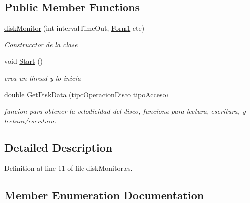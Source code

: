 \subsection*{Public Member Functions}
\begin{DoxyCompactItemize}
\item 
\hyperlink{class_windows_forms_application1_1_1_models_1_1disk_monitor_a1adc13f29078356113f2688eef9c1d70}{disk\+Monitor} (int interval\+Time\+Out, \hyperlink{class_windows_forms_application1_1_1_form1}{Form1} cte)
\begin{DoxyCompactList}\small\item\em Construcctor de la clase \end{DoxyCompactList}\item 
void \hyperlink{class_windows_forms_application1_1_1_models_1_1disk_monitor_aea00f90a1d1f844635454060c76133a0}{Start} ()
\begin{DoxyCompactList}\small\item\em crea un thread y lo inicia \end{DoxyCompactList}\item 
double \hyperlink{class_windows_forms_application1_1_1_models_1_1disk_monitor_a3d5bf64d33553c41813a96769b898503}{Get\+Disk\+Data} (\hyperlink{class_windows_forms_application1_1_1_models_1_1disk_monitor_a5e72e797fa7e0095f80d5069b11ae0ec}{tipo\+Operacion\+Disco} tipo\+Acceso)
\begin{DoxyCompactList}\small\item\em funcion para obtener la velodicidad del disco, funciona para lectura, escritura, y lectura/escritura. \end{DoxyCompactList}\end{DoxyCompactItemize}


\subsection{Detailed Description}


Definition at line 11 of file disk\+Monitor.\+cs.



\subsection{Member Enumeration Documentation}
\hypertarget{class_windows_forms_application1_1_1_models_1_1disk_monitor_a5e72e797fa7e0095f80d5069b11ae0ec}{}
